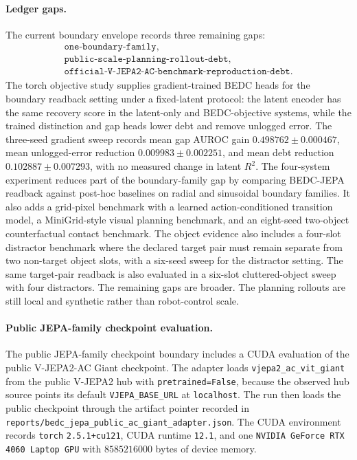 \paragraph{Ledger gaps.}
The current boundary envelope records three remaining gaps:
$$
\begin{array}{l}
\texttt{one-boundary-family},\\
\texttt{public-scale-planning-rollout-debt},\\
\texttt{official-V-JEPA2-AC-benchmark-reproduction-debt}.
\end{array}
$$
The torch objective study supplies gradient-trained BEDC heads for the
boundary readback setting under a fixed-latent protocol: the latent encoder
has the same recovery score in the latent-only and BEDC-objective systems,
while the trained distinction and gap heads lower debt and remove unlogged
error.  The three-seed gradient sweep records mean gap AUROC gain
$0.498762 \pm 0.000467$, mean unlogged-error reduction
$0.009983 \pm 0.002251$, and mean debt reduction
$0.102887 \pm 0.007293$, with no measured change in latent $R^2$.  The
four-system experiment reduces part of the boundary-family gap by comparing
BEDC-JEPA readback against post-hoc baselines on radial and sinusoidal
boundary families.  It also adds a grid-pixel benchmark with a learned
action-conditioned transition model, a MiniGrid-style visual planning
benchmark, and an eight-seed two-object counterfactual contact benchmark.  The
object evidence also includes a four-slot distractor benchmark where the
declared target pair must remain separate from two non-target object slots,
with a six-seed sweep for the distractor setting.  The same target-pair
readback is also evaluated in a six-slot cluttered-object sweep with four
distractors.  The remaining gaps are broader.  The planning rollouts are still
local and synthetic rather than robot-control scale.

\paragraph{Public JEPA-family checkpoint evaluation.}
The public JEPA-family checkpoint boundary includes a CUDA evaluation of the
public V-JEPA2-AC Giant checkpoint.  The adapter loads
\texttt{vjepa2\_ac\_vit\_giant} from the public V-JEPA2 hub with
\texttt{pretrained=False}, because the observed hub source points its default
\texttt{VJEPA\_BASE\_URL} at \texttt{localhost}.  The run then loads the
public checkpoint through the artifact pointer recorded in
\texttt{reports/bedc\_jepa\_public\_ac\_giant\_adapter.json}.
The CUDA environment records \texttt{torch} \texttt{2.5.1+cu121}, CUDA
runtime \texttt{12.1}, and one \texttt{NVIDIA GeForce RTX 4060 Laptop GPU}
with $8585216000$ bytes of device memory.

